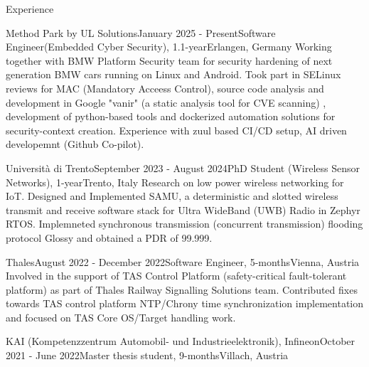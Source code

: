 \documentclass[
	a4paper, %
	11pt, %
]{resume} %
\begin{document}

\begin{rSection}{Experience}

    \begin{rSubsection}{Method Park by UL Solutions}{January 2025 - Present}{Software Engineer(Embedded Cyber Security), 1.1-year}{Erlangen, Germany}
    Working together with BMW Platform Security team for security hardening of next generation BMW cars running on Linux and Android. Took part in
    SELinux reviews for MAC (Mandatory Acceess Control), source code analysis and development in Google "vanir" (a static analysis tool for CVE scanning)
    , development of python-based tools and dockerized automation solutions for security-context creation.  Experience with zuul based CI/CD setup, AI driven
    developemnt (Github Co-pilot).

    
    \end{rSubsection}

    \begin{rSubsection}{Università di Trento}{September 2023 - August 2024}{PhD Student (Wireless Sensor Networks), 1-year}{Trento, Italy}
    Research on low power wireless networking for IoT. Designed and Implemented SAMU, a deterministic and slotted
    wireless transmit and receive software stack for Ultra WideBand (UWB) Radio in Zephyr RTOS. Implemneted synchronous transmission 
    (concurrent transmission) flooding protocol Glossy and obtained a PDR of 99.999.

    
    \end{rSubsection}

    \begin{rSubsection}{Thales}{August 2022 - December 2022}{Software Engineer, 5-months}{Vienna, Austria}
        Involved in the support of TAS Control Platform (safety-critical fault-tolerant platform) as part 
        of Thales Railway Signalling Solutions team. Contributed fixes towards TAS control platform NTP/Chrony time 
        synchronization implementation and focused on TAS Core OS/Target handling work.
		
    \end{rSubsection}

	\begin{rSubsection}{KAI (Kompetenzzentrum Automobil- und Industrieelektronik), Infineon}{October 2021 - June 2022}{Master thesis student, 9-months}{Villach, Austria}


\end{rSubsection}
\end{rSection}
\end{document}
